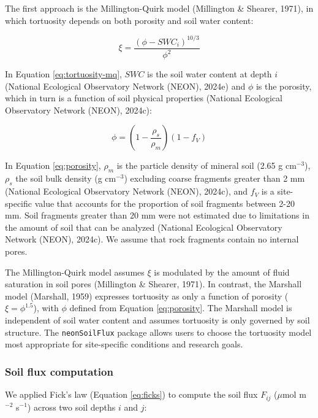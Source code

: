 \documentclass[
  letterpaper,
  DIV=11,
  numbers=noendperiod]{scrartcl}
\begin{document}
The first approach is the Millington-Quirk model (Millington \& Shearer,
1971), in which tortuosity depends on both porosity and soil water
content:

\begin{equation}
  \xi = \frac{(\phi - SWC_{i})^{10/3}}{\phi^{2}}
  \label{eq:tortuosity-mq}
\end{equation}

In Equation \ref{eq:tortuosity-mq}, \(SWC\) is the soil water content at
depth \(i\) (National Ecological Observatory Network (NEON), 2024e) and
\(\phi\) is the porosity, which in turn is a function of soil physical
properties (National Ecological Observatory Network (NEON), 2024c):

\begin{equation}
  \phi = \left(1- \frac{\rho_{s}}{\rho_{m}} \right) \left(1-f_{V}\right)
  \label{eq:porosity}
\end{equation}

In Equation \ref{eq:porosity}, \(\rho_{m}\) is the particle density of
mineral soil (2.65 g cm\(^{-3}\)), \(\rho_{s}\) the soil bulk density (g
cm\(^{-3}\)) excluding coarse fragments greater than 2 mm (National
Ecological Observatory Network (NEON), 2024c), and \(f_{V}\) is a
site-specific value that accounts for the proportion of soil fragments
between 2-20 mm. Soil fragments greater than 20 mm were not estimated
due to limitations in the amount of soil that can be analyzed (National
Ecological Observatory Network (NEON), 2024c). We assume that rock
fragments contain no internal pores.

The Millington-Quirk model assumes \(\xi\) is modulated by the amount of
fluid saturation in soil pores (Millington \& Shearer, 1971). In
contrast, the Marshall model (Marshall, 1959) expresses tortuosity as
only a function of porosity (\(\xi = \phi^{1.5}\)), with \(\phi\)
defined from Equation \ref{eq:porosity}. The Marshall model is
independent of soil water content and assumes tortuosity is only
governed by soil structure. The \texttt{neonSoilFlux} package allows
users to choose the tortuosity model most appropriate for site-specific
conditions and research goals.

\subsubsection{Soil flux computation}\label{sec-compute-soil-flux}

We applied Fick's law (Equation \ref{eq:ficks}) to compute the soil flux
\(F_{ij}\) (\(\mu\)mol m\(^{-2}\) s\(^{-1}\)) across two soil depths
\(i\) and \(j\):
\end{document}
